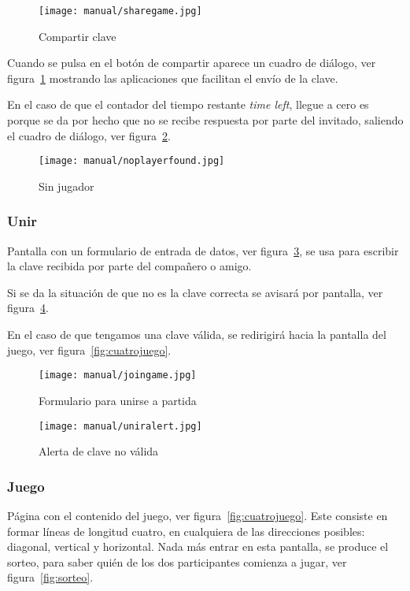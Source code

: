 \begin{figure}%
	\centering
	\texttt{[image: manual/sharegame.jpg]}
	\caption{Compartir clave}\label{fig:sharegame}
\end{figure}

Cuando se pulsa en el botón de compartir aparece un cuadro de diálogo, ver figura~\ref{fig:sharegame} mostrando las aplicaciones que facilitan el envío de la clave.

En el caso de que el contador del tiempo restante \emph{time left}, llegue a cero es porque se da por hecho que no se recibe respuesta por parte del invitado, saliendo el cuadro de diálogo, ver figura~\ref{fig:noplayerfound}.

\begin{figure}%
	\centering
	\texttt{[image: manual/noplayerfound.jpg]}
	\caption{Sin jugador}\label{fig:noplayerfound}
\end{figure}

\subsubsection{Unir}\label{cuatrounir}
Pantalla con un formulario de entrada de datos, ver figura~\ref{fig:cuatrounir}, se usa para escribir la clave recibida por parte del compañero o amigo. 

Si se da la situación de que no es la clave correcta se avisará por pantalla, ver figura~\ref{fig:uniralert}.

En el caso de que tengamos una clave válida, se redirigirá hacia la pantalla del juego, ver figura~\ref{fig:cuatrojuego}.

\begin{figure}%
	\centering
	\texttt{[image: manual/joingame.jpg]}
	\caption{Formulario para unirse a partida}\label{fig:cuatrounir}
\end{figure}

\begin{figure}%
	\centering
	\texttt{[image: manual/uniralert.jpg]}
	\caption{Alerta de clave no válida}\label{fig:uniralert}
\end{figure}

\subsubsection{Juego}\label{cuatrojuego}
Página con el contenido del juego, ver figura~\ref{fig:cuatrojuego}. Este consiste en formar líneas de longitud cuatro, en cualquiera de las direcciones posibles: diagonal, vertical y horizontal. Nada más entrar en esta pantalla, se produce el sorteo, para saber quién de los dos participantes comienza a jugar, ver figura~\ref{fig:sorteo}.

